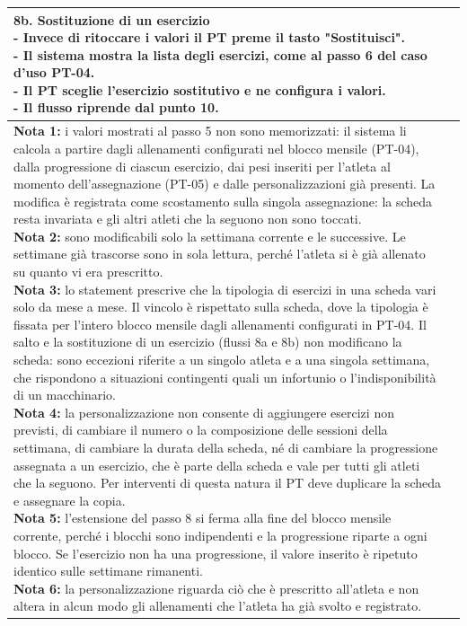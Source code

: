 \documentclass[../../../../SoftwareRequirementsSpecification.tex]{subfiles}
\begin{document}
\begin{tabularx}{\textwidth}{|l|X|}
{    \textbf{8b. Sostituzione di un esercizio} \newline
    - Invece di ritoccare i valori il PT preme il tasto
    "Sostituisci". \newline
    - Il sistema mostra la lista degli esercizi, come al passo 6 del
    caso d'uso PT-04. \newline
    - Il PT sceglie l'esercizio sostitutivo e ne configura i valori.
    \newline
    - Il flusso riprende dal punto 10.
  } \\ \hline
  \ucnote{
    \textbf{Nota 1:} i valori mostrati al passo 5 non sono
    memorizzati: il sistema li calcola a partire dagli allenamenti
    configurati nel blocco mensile (PT-04), dalla progressione di
    ciascun esercizio, dai pesi inseriti per l'atleta al momento
    dell'assegnazione (PT-05) e dalle personalizzazioni già
    presenti. La modifica è registrata come scostamento sulla
    singola assegnazione: la scheda resta invariata e gli altri
    atleti che la seguono non sono toccati.\newline
    \textbf{Nota 2:} sono modificabili solo la settimana corrente e
    le successive. Le settimane già trascorse sono in sola lettura,
    perché l'atleta si è già allenato su quanto vi era
    prescritto.\newline
    \textbf{Nota 3:} lo statement prescrive che la tipologia di
    esercizi in una scheda vari solo da mese a mese. Il vincolo è
    rispettato sulla scheda, dove la tipologia è fissata per
    l'intero blocco mensile dagli allenamenti configurati in PT-04.
    Il salto e la sostituzione di un esercizio (flussi 8a e 8b) non
    modificano la scheda: sono eccezioni riferite a un singolo atleta
    e a una singola settimana, che rispondono a situazioni
    contingenti quali un infortunio o l'indisponibilità di un
    macchinario.\newline
    \textbf{Nota 4:} la personalizzazione non consente di aggiungere
    esercizi non previsti, di cambiare il numero o la composizione
    delle sessioni della settimana, di cambiare la durata della
    scheda, né di cambiare la progressione assegnata a un
    esercizio, che è parte della scheda e vale per tutti gli atleti
    che la seguono. Per interventi di questa natura il PT deve
    duplicare la scheda e assegnare la copia.\newline
    \textbf{Nota 5:} l'estensione del passo 8 si ferma alla fine del
    blocco mensile corrente, perché i blocchi sono indipendenti e
    la progressione riparte a ogni blocco. Se l'esercizio non ha una
    progressione, il valore inserito è ripetuto identico sulle
    settimane rimanenti.\newline
    \textbf{Nota 6:} la personalizzazione riguarda ciò che è
    prescritto all'atleta e non altera in alcun modo gli allenamenti
    che l'atleta ha già svolto e registrato.
  } \\ \hline
\end{tabularx}
\end{document}
